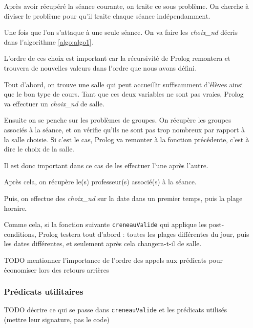 Après avoir récupéré la séance courante, on traite ce sous problème. 
On cherche à diviser le problème pour qu'il traite chaque séance indépendamment. 

Une fois que l'on s'attaque à une seule séance. On va faire les \emph{choix\_nd} décris dans l'algorithme \ref{algo:algo1}.

L'ordre de ces choix est important car la récursivité de Prolog remontera et trouvera de nouvelles valeurs dans l'ordre que nous avons défini.

Tout d'abord, on trouve une salle qui peut accueillir suffisamment d'élèves ainsi que le bon type de cours. Tant que ces deux variables ne sont pas vraies, Prolog va effectuer un \emph{choix\_nd} de salle.

Ensuite on se penche sur les problèmes de groupes. 
On récupère les groupes associés à la séance, et on vérifie qu'ils ne sont pas trop nombreux par rapport à la salle choisie. 
Si c'est le cas, Prolog va remonter à la fonction précédente, c'est à dire le choix de la salle. 

Il est donc important dans ce cas de les effectuer l'une après l'autre.

Après cela, on récupère le(s) professeur(s) associé(s) à la séance.

Puis, on effectue des \emph{choix\_nd} sur la date dans un premier temps, puis la plage horaire.

Comme cela, si la fonction suivante \texttt{creneauValide} qui applique les post-conditions, Prolog testera tout d'abord : toutes les plages différentes du jour, puis les dates différentes, et seulement après cela changera-t-il de salle.


TODO mentionner l'importance de l'ordre des appels aux prédicats pour économiser
lors des retours arrières

\subsubsection{Prédicats utilitaires}

TODO décrire ce qui se passe dans \texttt{creneauValide} et les prédicats
utilisés (mettre leur signature, pas le code)

